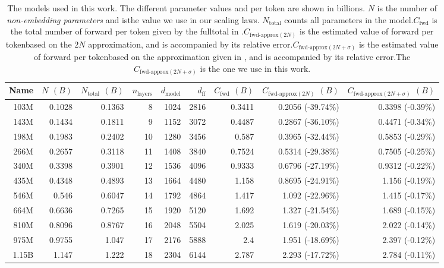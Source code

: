 \begin{table}[h]
\centering
{}
\caption{The models used in this work. The different parameter values and \flops per token are shown in billions. $N$ is the number of \emph{non-embedding parameters} and isthe value we use in our scaling laws. $N_{\text{total}}$ counts all parameters in the model.$C_{\text{fwd}}$ is the total number of forward \flops per token given by the fulltotal in .$C_{\text{fwd-approx} (2N)}$ is the estimated value of forward \flops per tokenbased on the $2N$ approximation, and is accompanied by its relative error.$C_{\text{fwd-approx} (2N+\sigma)}$ is the estimated value of forward \flops per tokenbased on the approximation given in , and is accompanied by its relative error.The $C_{\text{fwd-approx} (2N+\sigma)}$ is the one we use in this work.}
\label{tab:architectures}
\begin{tabular}{rrrrrrrrr}
\toprule
Name & $N$ $(B)$ & $N_{\text{total}}$ $(B)$ & $n_{\text{layers}}$ & $d_{\text{model}}$ & $d_{\text{ff}}$ & $C_{\text{fwd}}$ $(B)$ & $C_{\text{fwd-approx} (2N)}$ $(B)$ & $C_{\text{fwd-approx} (2N+\sigma)}$ $(B)$\\
\midrule
103M & 0.1028 & 0.1363 & 8 & 1024 & 2816 & 0.3411 & 0.2056 (-39.74\%) & 0.3398 (-0.39\%)\\
143M & 0.1434 & 0.1811 & 9 & 1152 & 3072 & 0.4487 & 0.2867 (-36.10\%) & 0.4471 (-0.34\%)\\
198M & 0.1983 & 0.2402 & 10 & 1280 & 3456 & 0.587 & 0.3965 (-32.44\%) & 0.5853 (-0.29\%)\\
266M & 0.2657 & 0.3118 & 11 & 1408 & 3840 & 0.7524 & 0.5314 (-29.38\%) & 0.7505 (-0.25\%)\\
340M & 0.3398 & 0.3901 & 12 & 1536 & 4096 & 0.9333 & 0.6796 (-27.19\%) & 0.9312 (-0.22\%)\\
435M & 0.4348 & 0.4893 & 13 & 1664 & 4480 & 1.158 & 0.8695 (-24.91\%) & 1.156 (-0.19\%)\\
546M & 0.546 & 0.6047 & 14 & 1792 & 4864 & 1.417 & 1.092 (-22.96\%) & 1.415 (-0.17\%)\\
664M & 0.6636 & 0.7265 & 15 & 1920 & 5120 & 1.692 & 1.327 (-21.54\%) & 1.689 (-0.15\%)\\
810M & 0.8096 & 0.8767 & 16 & 2048 & 5504 & 2.025 & 1.619 (-20.03\%) & 2.022 (-0.14\%)\\
975M & 0.9755 & 1.047 & 17 & 2176 & 5888 & 2.4 & 1.951 (-18.69\%) & 2.397 (-0.12\%)\\
1.15B & 1.147 & 1.222 & 18 & 2304 & 6144 & 2.787 & 2.293 (-17.72\%) & 2.784 (-0.11\%)\\

\end{tabular}
\end{table}
